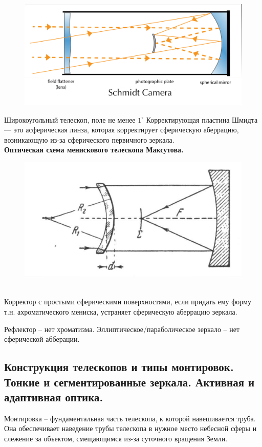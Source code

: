 \documentclass[12pt]{article}
\begin{document}
\begin{itemize}
\begin{figure}[h]
	\centering
	\includegraphics[width=0.7\linewidth]{Schmidt_Camera}
\end{figure}
		Широкоугольный телескоп, поле не менее $1^{\circ}$
		Корректирующая пластина Шмидта — это асферическая линза, которая корректирует сферическую аберрацию, возникающую из-за сферического первичного зеркала.\\
	\textbf{Оптическая схема менискового телескопа
		Максутова.}
\begin{figure}[h]
	\centering
	\includegraphics[width=0.7\linewidth]{"Снимок экрана от 2024-12-22 18-56-32"}
\end{figure}\\
Корректор с простыми сферическими поверхностями, если придать ему форму т.н.
ахроматического мениска, устраняет сферическую аберрацию зеркала.
\end{itemize}

Рефлектор – нет хроматизма.
Эллиптическое/параболическое зеркало – нет сферической абберации.

	\subsection{Конструкция телескопов и типы монтировок. Тонкие и сегментированные зеркала. Активная и адаптивная оптика.}
	
	Монтировка – фундаментальная часть телескопа, к которой навешивается труба. Она обеспечивает наведение трубы телескопа в нужное место небесной сферы и слежение за объектом, смещающимся из-за	суточного вращения Земли.
	
\end{document}
